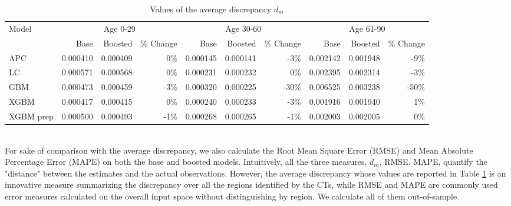 \documentclass[fleqn,10pt]{wlscirep}
\begin{document}
\begin{table}[ht]
\centering
\footnotesize
\begin{tabular}{|l|r|r|r|r|r|r|r|r|r|}
\hline
\multirow{2}{*}{Model} & \multicolumn{3}{c|}{Age 0-29} & \multicolumn{3}{c|}{Age 30-60} & \multicolumn{3}{c|}{Age 61-90} \\
\cline{2-10}
			&	Base 	&	Boosted 	& \% Change &	Base 	&	Boosted 	& \% Change &	Base 	&	Boosted	& \% Change\\
\hline
APC 	&	0.000410	&	0.000409	&	0\%	&	0.000145	&	0.000141	&	-3\%	&	0.002142	&	0.001948	&	-9\%	\\
LC 	&	0.000571	&	0.000568	&	0\%	&	0.000231	&	0.000232	&	0\%	&	0.002395	&	0.002314	&	-3\%	\\
GBM 	&	0.000473	&	0.000459	&	-3\%	&	0.000320	&	0.000225	&	-30\%	&	0.006525	&	0.003238	&	-50\%	\\
XGBM 	&	0.000417	&	0.000415	&	0\%	&	0.000240	&	0.000233	&	-3\%	&	0.001916	&	0.001940	&	1\%	\\
XGBM prep 	&	0.000500	&	0.000493	&	-1\%	&	0.000268	&	0.000265	&	-1\%	&	0.002003	&	0.002005	&	0\%	\\
\hline
\end{tabular}
\caption{Values of the average discrepancy $\bar{d}_m$}
\label{tab:avecri}
\end{table}\\
For sake of comparison with the average discrepancy, we also calculate the Root Mean Square Error (RMSE) and Mean Absolute Percentage Error (MAPE) on both the base and boosted models. 
Intuitively, all the three measures, $\bar{d}_m$, RMSE, MAPE, quantify the "distance" between the estimates and the actual observations. 
However, the average discrepancy whose values are reported in Table \ref{tab:avecri} is an innovative measure summarizing the discrepancy over all the regions identified by the CTs, while RMSE and MAPE are commonly used error measures calculated on the overall input space without distinguishing by region. We calculate all of them out-of-sample.
\end{document}
